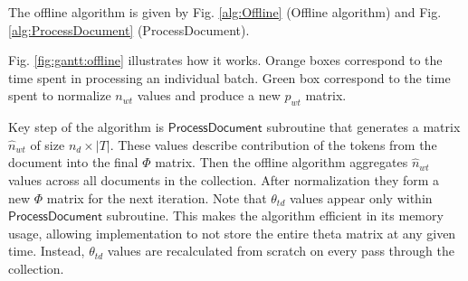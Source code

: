 \documentclass[russian,english]{llncs}
\newcommand{\kw}[1]{\textsf{#1}}
\newcounter{wavenum}
\newcommand*{\clki}{
  \draw (t_cur) -- ++(0,.0) -- ++(.5,0) -- ++(0,-.0) -- ++(.5,0) -- ++(0,.0)
    node[time] (t_cur) {};
}
\newcommand*{\bitvector}[6]{
  \fill[fill=#3, pattern=#5, pattern color=#4,fill opacity=#6]
                         (t_cur) -- ++( .0, .2) -- ++(#2-.0,0) -- ++(.0, -.18)
                         -- ++(-.0,-.18) -- ++(.0-#2,0) -- cycle;
  \path (t_cur) -- node[anchor=mid] {#1} ++(#2,0) node[time] (t_cur) {};
}
\newcommand*{\Wait}[2]{
    \bitvector{#1}{#2}{white}{white}{}{0.0}
}
\newcommand*{\ProcBatchOne}[2][XXX]{
    \bitvector{#1}{#2}{orange}{orange}{}{1.0}
}
\newcommand*{\Normalization}[2][XXX]{
    \bitvector{#1}{#2}{green}{green}{}{1.0}
}
\newcommand{\nextwave}[1]{
  \path (0,\value{wavenum} * 0.5) node[left] {#1} node[time] (t_cur) {};
  \addtocounter{wavenum}{-1}
}
\newenvironment{wave}[3][\bf{time}]{
  \begin{tikzpicture}[draw=black, yscale=1.5,xscale=1.0]
    \tikzstyle{time}=[coordinate]
    \setlength{\unitlength}{1cm}
    \def\wavewidth{#3}
    \setcounter{wavenum}{0}
    \nextwave{#1}

    \draw[dotted] (t_cur) +(0,.1) node[above] {t=0\%} -- ++(0,2.8-#2);
    \clki
    \foreach \t in {1,...,\wavewidth}{
      \draw[dotted] (t_cur) +(0,.1) node[above] {\t0\%} -- ++(0,2.8-#2);
      \clki
    }
}{\end{tikzpicture}}
\begin{document}

The offline algorithm is given by
Fig. \ref{alg:Offline} (\kw{Offline algorithm}) and
Fig. \ref{alg:ProcessDocument} (\kw{ProcessDocument}).


Fig. \ref{fig:gantt:offline} illustrates how it works.
Orange boxes correspond to the time spent in processing an individual batch.
Green box correspond to the time spent to normalize $n_{wt}$ values and produce a new $p_{wt}$ matrix.

Key step of the algorithm is $\kw{ProcessDocument}$ subroutine
that generates a matrix $\hat n_{wt}$ of size $n_d \times |T|$.
These values describe contribution of the tokens from the document into the final $\Phi$ matrix.
Then the offline algorithm aggregates $\hat n_{wt}$ values across all documents in the collection.
After normalization they form a new $\Phi$ matrix for the next iteration.
Note that $\theta_{td}$ values appear only within $\kw{ProcessDocument}$ subroutine.
This makes the algorithm efficient in its memory usage,
allowing implementation to not store the entire theta matrix at any given time.
Instead, $\theta_{td}$ values are recalculated from scratch on every pass through the collection.
\end{document}
